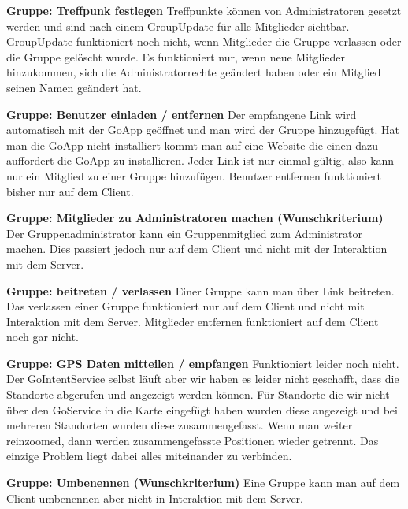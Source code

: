 \textbf{Gruppe: Treffpunk festlegen}
Treffpunkte können von Administratoren gesetzt werden und sind nach einem GroupUpdate für alle Mitglieder sichtbar. GroupUpdate funktioniert noch nicht, wenn Mitglieder die Gruppe verlassen oder die Gruppe gelöscht wurde. Es funktioniert nur, wenn neue Mitglieder hinzukommen, sich die Administratorrechte geändert haben oder ein Mitglied seinen Namen geändert hat.

\textbf{Gruppe: Benutzer einladen / entfernen}
Der empfangene Link wird automatisch mit der GoApp geöffnet und man wird der Gruppe hinzugefügt. Hat man die GoApp nicht installiert kommt man auf eine Website die einen dazu auffordert die GoApp zu installieren. Jeder Link ist nur einmal gültig, also kann nur ein Mitglied zu einer Gruppe hinzufügen. Benutzer entfernen funktioniert bisher nur auf dem Client.

\textbf{Gruppe: Mitglieder zu Administratoren machen (Wunschkriterium)}
Der Gruppenadministrator kann ein Gruppenmitglied zum Administrator machen. Dies passiert jedoch nur auf dem Client und nicht mit der Interaktion mit dem Server.

\textbf{Gruppe: beitreten / verlassen}
Einer Gruppe kann man über Link beitreten. Das verlassen einer Gruppe funktioniert nur auf dem Client und nicht mit Interaktion mit dem Server. Mitglieder entfernen funktioniert auf dem Client noch gar nicht.

\textbf{Gruppe: GPS Daten mitteilen / empfangen}
Funktioniert leider noch nicht. Der GoIntentService selbst läuft aber wir haben es leider nicht geschafft, dass die Standorte abgerufen und   angezeigt werden können. Für Standorte die wir nicht über den GoService in die Karte eingefügt haben wurden diese angezeigt und bei mehreren  Standorten wurden diese zusammengefasst. Wenn man weiter reinzoomed, dann werden zusammengefasste Positionen wieder getrennt. Das einzige     Problem liegt dabei alles miteinander zu verbinden.

\textbf{Gruppe: Umbenennen (Wunschkriterium)}
Eine Gruppe kann man auf dem Client umbenennen aber nicht in Interaktion mit dem Server.
